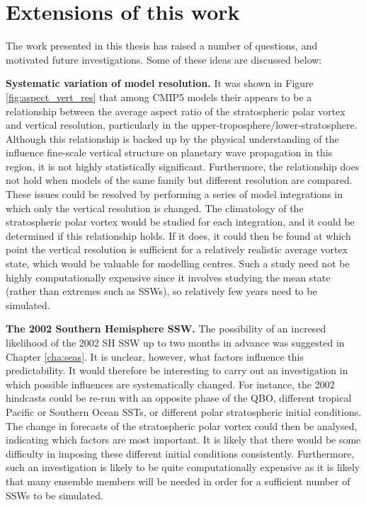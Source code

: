 
\section{Extensions of this work}

The work presented in this thesis has raised a number of questions, and
motivated future investigations. Some of these ideas are discussed below:

\bigskip\noindent\textbf{Systematic variation of model resolution.} It was shown
in Figure \ref{fig:aspect_vert_res} that among CMIP5 models their appears to be
a relationship between the average aspect ratio of the stratospheric polar
vortex and vertical resolution, particularly in the
upper-troposphere/lower-stratosphere. Although this relationship is backed up by
the physical understanding of the influence fine-scale vertical structure on
planetary wave propagation in this region, it is not highly statistically
significant. Furthermore, the relationship does not hold when models of the same
family but different resolution are compared. These issues could be resolved by
performing a series of model integrations in which only the vertical resolution
is changed. The climatology of the stratospheric polar vortex would be studied
for each integration, and it could be determined if this relationship holds. If
it does, it could then be found at which point the vertical resolution is
sufficient for a relatively realistic average vortex state, which would be
valuable for modelling centres. Such a study need not be highly computationally
expensive since it involves studying the mean state (rather than extremes such
as SSWs), so relatively few years need to be simulated. 


\bigskip\noindent\textbf{The 2002 Southern Hemisphere SSW.} The possibility of
an incresed likelihood of the 2002 SH SSW up to two months in advance was
suggested in Chapter \ref{cha:seas}. It is unclear, however, what factors
influence this predictability. It would therefore be interesting to carry out an
investigation in which possible influences are systematically changed. For
instance, the 2002 hindcasts could be re-run with an opposite phase of the QBO,
different tropical Pacific or Southern Ocean SSTs, or different polar
stratospheric initial conditions. The change in forecasts of the stratospheric
polar vortex could then be analysed, indicating which factors are most
important. It is likely that there would be some difficulty in imposing these
different initial conditions consistently. Furthermore, such an investigation is
likely to be quite computationally expensive as it is likely that many ensemble
members will be needed in order for a sufficient number of SSWs to be
simulated. 


